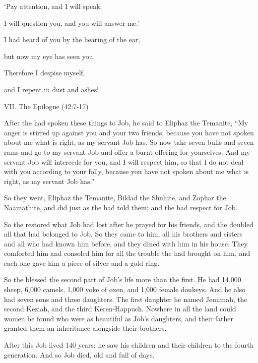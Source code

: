 {\par }{\Q ‘Pay attention,
and I
will speak;
\par }{\Q I will question you, and you will answer me.’
\par }{\Q {}I had heard
of you by the hearing
of the ear,
\par }{\Q but now
my eye
has seen you.
\par }{\Q {}Therefore
I despise
myself,
\par }{\Q and I repent
in dust
and ashes!
\par }{\SH \par }{\MS VII. The Epilogue (42:7-17)
\par }{\PP {}After
the {}
had
spoken
these
things
to
Job,
he said
to
Eliphaz
the Temanite,
“My anger
is stirred up
against you and your two
friends,
because
you have not
spoken
about me
what
is right,
as my servant
Job has.
So now
take
seven
bulls
and seven
rams
and go
to
my servant
Job
and offer
a burnt offering
for
yourselves. And my servant
Job
will intercede
for
you, and I will respect him, so that I do not deal
with
you according to your folly,
because
you have not
spoken
about me
what
is right,
as my servant
Job has.”
\par }{\PP {}So they went,
Eliphaz
the Temanite,
Bildad
the Shuhite,
and Zophar
the Naamathite,
and did
just
as the
{}
had told
them;
and the
{}
had respect
for Job.
\par }{\PP {}So the
{}
restored
what Job
had lost after he prayed
for
his friends,
and the
{}
doubled
all
that had belonged
to Job.
So they came
to
him, all
his brothers
and sisters
and all
who had known
him before,
and they dined
with
him in his house.
They comforted
him and consoled
him for all
the trouble
the {}
had
brought
on
him, and each
one
gave
him a piece of silver
and a
gold
ring.
\par }{\PP {}So the
{}
blessed
the second part
of Job’s
life more than the first.
He had 14,000
sheep,
6,000
camels,
1,000
yoke
of oxen,
and 1,000
female donkeys.
And he also had seven
sons
and three
daughters.
The first
daughter he named
Jemimah,
the second
Keziah,
and the third
Keren-Happuch.
Nowhere in all
the land
could women
be found
who were as beautiful
as Job’s
daughters,
and their father
granted
them
an inheritance
alongside
their brothers.
\par }{\PP {}After
this
Job
lived
140
years;
he saw
his children
and their children
to the fourth
generation.
And so Job
died,
old
and full
of days.
\par }